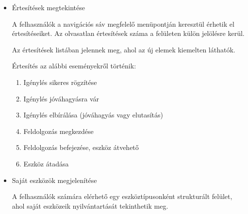\documentclass[
]{thesis-ekf}
\theoremstyle{definition}
\theoremstyle{remark}
\begin{document}
\begin{itemize}
	A főoldalon a leadott igénylések táblázatos formában, az alábbi adatokkal kerülnek megjelenítésre:
	
	\begin{itemize}
		\item Igénylés azonosító
		
		Minden igénylés egyedi azonosítóval rendelkezik.
		
		\item Eszköz típusa
		
		\item Átvétel helye
		
		\item Státusz
		
		\item Részletek megtekintése gomb
		
		Az adott igénylés részletes adatainak megjelenítése.
		
		\item Törlés gomb
		
		Amennyiben a feldolgozás még nem kezdődött meg, az igénylés törölhető.
	\end{itemize}
	
	\item Értesítések megtekintése
	
	A felhasználók a navigációs sáv megfelelő menüpontján keresztül érhetik el értesítéseiket. Az olvasatlan értesítések száma a felületen külön jelölésre kerül.
	
	Az értesítések listában jelennek meg, ahol az új elemek kiemelten láthatók.
	
	Értesítés az alábbi eseményekről történik:
	
	\begin{enumerate}
		\item Igénylés sikeres rögzítése
		\item Igénylés jóváhagyásra vár
		\item Igénylés elbírálása (jóváhagyás vagy elutasítás)
		\item Feldolgozás megkezdése
		\item Feldolgozás befejezése, eszköz átvehető
		\item Eszköz átadása
	\end{enumerate}
	
	\item Saját eszközök megjelenítése 
	
	A felhasználók számára elérhető egy eszköztípusonként strukturált felület, ahol saját eszközeik nyilvántartását tekinthetik meg.
	

\end{itemize}
\end{document}
